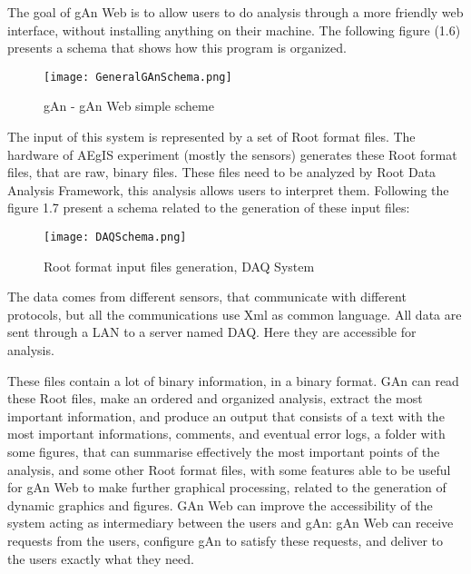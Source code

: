 The goal of gAn Web is to allow users to do analysis through a more friendly web interface, without installing anything on their machine. The following figure (1.6) presents a schema that shows how this program is organized.

\begin{figure}[H]
\centering
\texttt{[image: GeneralGAnSchema.png]} 
\caption{gAn - gAn Web simple scheme}
\end{figure}

The input of this system is represented by a set of Root format files. 
The hardware of AEgIS experiment (mostly the sensors) generates these Root format files, that are raw, binary files. These files need to be analyzed by Root Data Analysis Framework, this analysis allows users to interpret them. 
Following the figure 1.7 present a schema related to the generation of these input files:

\begin{figure}[H]
\centering
\texttt{[image: DAQSchema.png]} 
\caption{Root format input files generation, DAQ System}
\end{figure}

The data comes from different sensors, that communicate with different protocols, but all the communications use Xml as common language. All data are sent through a LAN to a server named DAQ. Here they are accessible for analysis. 

These files contain a lot of binary information, in a binary format. GAn can read these Root files, make an ordered and organized analysis, extract the most important information, and produce an output that consists of a text with the most important informations, comments, and eventual error logs, a folder with some figures, that can summarise effectively the most important points of the analysis, and some other Root format files, with some features able to be useful  for gAn Web to make further graphical processing, related to the generation of dynamic graphics and figures. GAn Web can improve the accessibility of the system acting as intermediary between the users and gAn: gAn Web can receive requests from the users, configure gAn to satisfy these requests, and deliver to the users exactly what they need.
